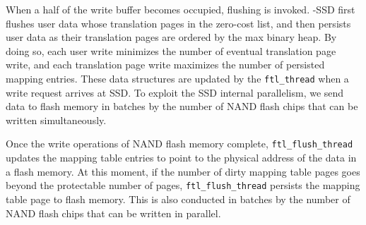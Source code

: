 When a half of the write buffer becomes occupied, flushing is invoked. \ours{}-SSD
first flushes user data whose translation pages in the zero-cost list, and then
persists user data as their translation pages are ordered by the max binary
heap. By doing so, each user write minimizes the number of eventual
translation page write, and each translation page write maximizes the number of
persisted mapping entries. These data structures are updated by the \texttt{ftl\_thread} 
when a write request arrives at SSD. 
To exploit the SSD internal parallelism, we send data to flash memory in
batches by the number of NAND flash chips that can be written simultaneously.

Once the write operations of NAND flash memory complete,
\texttt{ftl\_flush\_thread} updates the mapping table entries to point to the
physical address of the data in a flash memory.  At this moment, if the number
of dirty mapping table pages goes beyond the protectable number of pages,
\texttt{ftl\_flush\_thread} persists the mapping table page to flash memory.
This is also conducted in batches by the number of NAND flash chips that can be
written in parallel.
